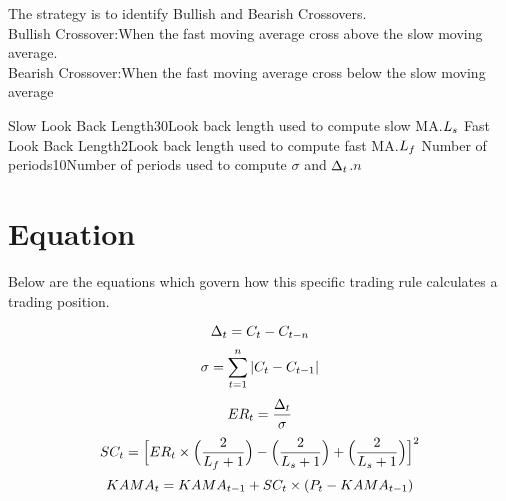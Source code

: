\documentclass{article}
\begin{document}
\logo
{} %
\tblofcontents


\howtotrade
{The strategy is to identify Bullish and Bearish Crossovers. \\
Bullish Crossover:When the fast moving average cross above the slow moving average. \\
Bearish Crossover:When the fast moving average cross below the slow moving average
}

{Slow Look Back Length}{30}{Look back length used to compute slow MA.}{$L_{s}$}
{Fast Look Back Length}{2}{Look back length used to compute fast MA.}{$L_{f}$}
{Number of periods}{10}{Number of periods used to compute $\sigma$ and $\Delta_{t}$.}{$n$}
\stoptable %

\newpage
\section{Equation}
Below are the equations which govern how this specific trading rule calculates a trading position.

\begin{equation}
    \Delta_{t} = C_{t} - C_{t - n}
\end{equation}
\begin{equation}
    \sigma = \sum_{t=1}^{n} |{C_{t} - C_{t-1}}|
\end{equation}
\begin{equation}
    ER_{t} = \frac{\Delta_{t}}{\sigma}
\end{equation}
\begin{equation}
    SC_{t} = \Big[ER_{t} \times \Big(\frac{2}{L_{f} + 1}\Big) -
    \Big(\frac{2}{L_{s} + 1}\Big) + \Big(\frac{2}{L_{s} + 1}\Big)\Big]^2
\end{equation}
\begin{equation}
    KAMA_{t} = KAMA_{t-1} + SC_{t} \times (P_{t} - KAMA_{t-1})
\end{equation}
\end{document}
